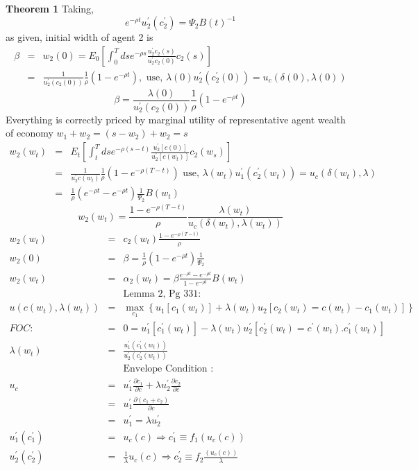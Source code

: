 \documentclass[]{article}
\begin{document}
\textbf{Theorem 1}
Taking,
\begin{equation*}
e^{-\rho t} u_2^\prime(c_2^\prime) = \Psi_2 B(t)^{-1}
\end{equation*}
as given, initial width of agent 2 is 
\begin{eqnarray*}
\beta &=& w_2(0) = E_0\left[\int_0^T ds e^{-\rho s} \frac{u_2^\prime c_2(s)}{u_2^\prime c_2(0)}c_2(s)\right]\\
&=& \frac{1}{u_2^\prime(c_2(0))} \frac{1}{\rho} (1-e^{-\rho t}), \mbox{  use, } \lambda(0) u_2^\prime(c_2^\prime(0)) = u_c(\delta(0), \lambda(0))
\end{eqnarray*}
\begin{equation}
\beta = \frac{\lambda(0)}{u_2^\prime(c_2(0))} \frac{1}{\rho} (1-e^{-\rho t}) \tag{24}
\end{equation}
Everything is correctly priced by marginal utility of representative agent wealth of economy $w_1+w_2 = (s-w_2)+w_2 = s$
\begin{eqnarray*}
w_2(w_t)&=& E_t\left[\int_t^T ds e^{-\rho (s-t)}\frac{u_2^\prime[c(0)]}{u_2^\prime[c(w_t)]} c_2(w_s)\right]\\
&=& \frac{1}{u_2^\prime c(w_t)} \frac{1}{\rho} (1-e^{-\rho (T-t)}) \mbox{ use, } \lambda(w_t)u_1^\prime(c_2^\prime(w_t)) = u_c(\delta(w_t), \lambda)\\
&=& \frac{1}{\rho} (e^{-\rho t} - e^{-\rho t}) \frac{1}{\Psi_2} B(w_t)
\end{eqnarray*}
\begin{equation}
w_2(w_t)=\frac{1-e^{-\rho(T-t)}}{\rho} \frac{\lambda (w_t)}{u_c(\delta(w_t),\lambda(w_t))} \tag{26B}
\end{equation}
\begin{eqnarray*}
w_2(w_t) &=& c_2(w_t) \frac{1-e^{-\rho (T-t)}}{\rho}\\
w_2(0) &=& \beta = \frac{1}{\rho} (1-e^{-\rho t}) \frac{1}{\Psi_2}\\
w_2(w_t) &=& \alpha_2(w_t) = \beta \frac{e^{-\rho t} - e^{-\rho t}}{1-e^{-\rho t}} B(w_t)\\
&&\mbox{Lemma 2, Pg 331:}\\
u(c(w_t),\lambda(w_t)) &=& \max_{c_1} \left\{u_1[c_1(w_t)] + \lambda(w_t)u_2 [c_2(w_t)=c(w_t)-c_1(w_t)]\right\}\\
FOC: &=& 0=u_1^\prime [c_1^\prime(w_t)] - \lambda(w_t) u_2^\prime [c_2^\prime(w_t) = c^\prime(w_t).c_1^\prime(w_t)]\\
\lambda (w_t) &=& \frac{u_1^\prime(c_1^\prime(w_t))}{u_2^\prime(c_2^\prime(w_t))}\\
&& \mbox{Envelope Condition : }\\
u_c &=& u_1^\prime \frac{\partial c_1}{\partial c} + \lambda u_2^\prime \frac{\partial c_2}{\partial c}\\
&=& u_1^\prime \frac{\partial (c_1+c_2)}{\partial c}\\
&=& u_1^\prime = \lambda u_2^\prime\\
u_1^\prime(c_1^\prime) &=& u_c(c) \Rightarrow c_1^\prime \equiv f_1(u_c(c))\\
u_2^\prime(c_2^\prime) &=& \frac{1}{\lambda} u_c(c) \Rightarrow c_2^\prime \equiv f_2 \frac{(u_c(c))}{\lambda}
\end{eqnarray*}
\end{document}
